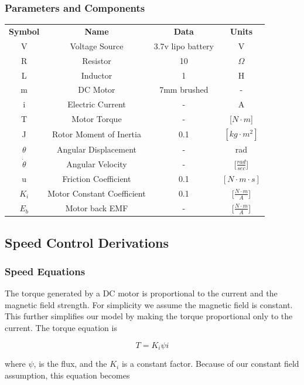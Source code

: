 	\subsubsection{Parameters and Components}
    \begin{tabular}{cccc}
\textbf{Symbol}		& \textbf{Name}			& \textbf{Data}			& \textbf{Units} \\
V 				& Voltage Source			& 3.7v lipo battery & V	\\
R 				& Resistor					& 10 		 & $\Omega $		\\
L 				& Inductor					& 1 				 & H	\\
m 				& DC Motor					& 7mm brushed		 & -	\\
i 				& Electric Current			& -				 & A	\\
T 				& Motor Torque				& -				 & [$N \cdot m$]	\\
J				& Rotor Moment of Inertia 	& 0.1 & $[kg \cdot m^{2}]$  	\\
$ \theta $		& Angular Displacement 		& -  & 	rad\\
$ \dot{\theta}$ & Angular Velocity 			& -  & [$ \frac{rad}{sec}	$]\\
u 				& Friction Coefficient		& 0.1  		& $[N \cdot m \cdot s]$	\\
$ K_{i} $ 		& Motor Constant Coefficient& 0.1  & [$ \frac{N \cdot m}{A}$]	\\
$ E_{b}	$		& Motor back EMF			&	- & [$ \frac{N \cdot m}{A}$]\\
\end{tabular}
\subsection{Speed Control Derivations}
	\subsubsection{Speed Equations}
    The torque generated by a DC motor is proportional to the current and the magnetic field strength. For simplicity we assume the magnetic field is constant. This further simplifies our model by making the torque proportional only to the current. The torque equation is

\begin{equation}
 T = K_{i} \psi i
\end{equation}

\noindent where $ \psi $, is the flux, and the $ K_{i} $ is a constant factor. Because of our constant field assumption, this equation becomes 

